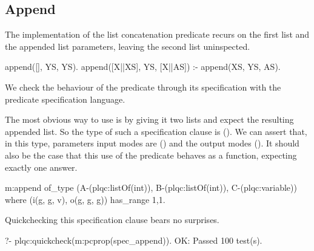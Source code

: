 

\subsection{Append}
The %
implementation of the list concatenation predicate recurs on the first list
and the appended list parameters, leaving the second list uninspected.
%
\begin{yapcode}
 append([], YS, YS).
 append([X||XS], YS, [X||AS]) :- append(XS, YS, AS).
\end{yapcode}
%
We check the behaviour of the  predicate
through its specification with the predicate specification language.
%


The most obvious way to use  is by giving it two lists and expect
the resulting appended list.
%
So the type of such a specification clause is
().
%
We can assert that, in this \plqc{} type, parameters input modes are
() and the output modes ().
%
It should also be the case that this use of the predicate behaves as a
function, expecting exactly one answer.
%
\begin{yapcode}
 m:append of_type
    (A-(plqc:listOf(int)), B-(plqc:listOf(int)), C-(plqc:variable))
   where (i(g, g, v), o(g, g, g))  has_range {1,1}.
\end{yapcode}
%
Quickchecking this specification clause bears no surprises.
%
\begin{yapcode}
   ?- plqc:quickcheck(m:pcprop(spec_append)).
 OK: Passed 100 test(s).
\end{yapcode}


